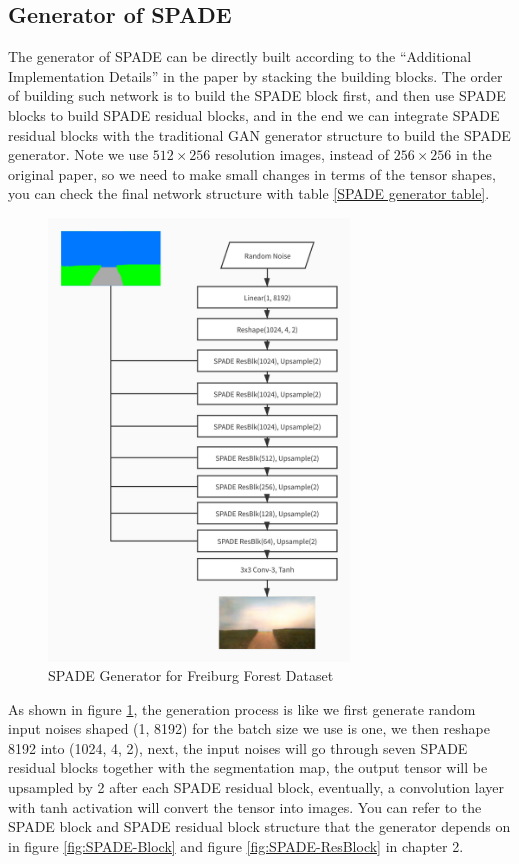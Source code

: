 \subsection{Generator of SPADE}
The generator of SPADE can be directly built according to the “Additional Implementation Details”
in the paper \cite{park2019SPADE} by stacking the building blocks. The order of building such 
network is to build the SPADE block first, and then use SPADE blocks to build SPADE residual 
blocks, and in the end we can integrate SPADE residual blocks with the traditional GAN generator 
structure to build the SPADE generator. Note we use $512\times256$ resolution images, 
instead of $256\times256$ in the original paper, so we need 
to make small changes in terms of the tensor shapes, you can check the final network structure 
with table \ref{SPADE generator table}. 
\begin{figure}[H]
    \begin{center}
    \includegraphics[width=8cm]{figures/SPADE-imp-generator}
    \end{center}
    \caption{SPADE Generator for Freiburg Forest Dataset}
    \label{fig:SPADE-imp-generator}
\end{figure} 

As shown in figure \ref{fig:SPADE-imp-generator}, the generation process is like we first 
generate random input noises shaped (1, 8192) for the batch size we use is one, we then 
reshape 8192 into (1024, 4, 2), next, the input noises will go through seven SPADE residual blocks 
together with the segmentation map, the output tensor will be upsampled 
by 2 after each SPADE residual block, eventually, a convolution layer with tanh activation 
will convert the tensor into images. You can refer to the SPADE block and SPADE residual block 
structure that the generator depends on in figure \ref{fig:SPADE-Block} and 
figure \ref{fig:SPADE-ResBlock} in chapter 2.
